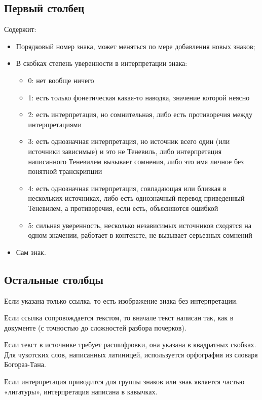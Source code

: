 \documentclass{article}
\begin{document}
\subsection{Первый столбец}
Содержит: 

\begin{itemize}
\item Порядковый номер знака, может меняться по мере добавления новых знаков; 
\item В скобках степень уверенности в интерпретации знака:
	\begin{itemize}
		\item 0:	нет вообще ничего
		\item 1: 	есть только фонетическая какая-то наводка, значение которой неясно
		\item 2:	есть интерпретация, но сомнительная, либо есть противоречия между интерпретациями
		\item 3:	есть однозначная интерпретация, но источник всего один (или источники зависимые) и это не Теневиль, либо интерпретация написанного Теневилем вызывает сомнения, либо это имя личное без понятной транскрипции
		\item 4:	есть однозначная интерпретация, совпадающая или близкая в нескольких источниках,  либо есть однозначный перевод приведенный Теневилем, а противоречия, если есть, объясняются ошибкой
		\item 5:	сильная уверенность, несколько независимых источников сходятся на одном значении, работает в контексте, не вызывает серьезных сомнений %
	\end{itemize}
\item Сам знак.
\end{itemize}

\subsection{Остальные столбцы}

Если указана только ссылка, то есть изображение знака без интерпретации.

Если ссылка сопровождается текстом, то вначале текст написан так, как в документе (с точностью до сложностей разбора почерков). 

Если текст в источнике требует расшифровки, она указана в квадратных скобках. Для чукотских слов, написанных латиницей, используется орфография из словаря Богораз-Тана\cite{bogoraz1937}.

Если интерпретация приводится для группы знаков или знак является частью «лигатуры», интерпретация написана в кавычках.
\end{document}
